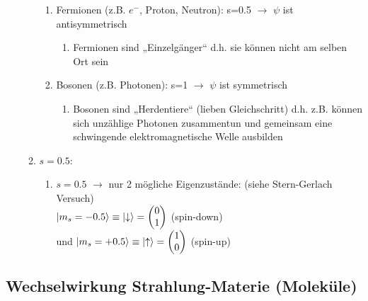 \begin{enumerate}
\begin{enumerate}
\begin{enumerate}
    \item Fermionen (z.B. $e^-$, Proton, Neutron): s=0.5  $\rightarrow$ $\psi$ ist antisymmetrisch
    \begin{enumerate}
        \item Fermionen sind „Einzelgänger“ d.h. sie können nicht am selben Ort sein
    \end{enumerate}
    \item Bosonen (z.B. Photonen): s=1 $\rightarrow$ $\psi$ ist symmetrisch 
    \begin{enumerate}
        \item Bosonen sind „Herdentiere“ (lieben Gleichschritt) d.h. z.B.  können sich unzählige
        Photonen zusammentun und gemeinsam eine schwingende elektromagnetische Welle ausbilden 
    \end{enumerate}
\end{enumerate}
\item $s=0.5$:
\begin{enumerate}
    \item $s=0.5$ $\rightarrow$ nur 2 mögliche Eigenzustände: (siehe Stern-Gerlach Versuch)\\
    $\ket{m_s=-0.5}\equiv\ket{\downarrow}=\begin{pmatrix} 0\\ 1 \end{pmatrix}$  (spin-down) \\
    und $\ket{m_s=+0.5}\equiv\ket{\uparrow}=\begin{pmatrix} 1\\ 0\end{pmatrix}$ (spin-up)
\end{enumerate}
\end{enumerate}
\end{enumerate}


\subsection{Wechselwirkung Strahlung-Materie (Moleküle)}